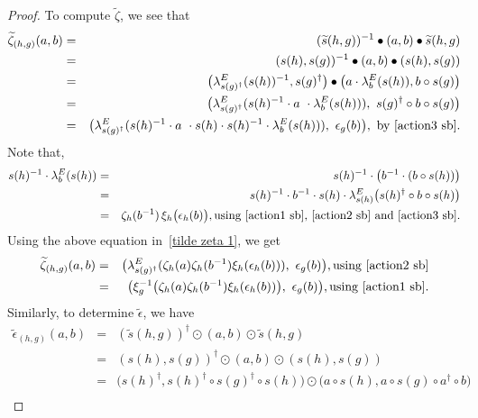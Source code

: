 \documentclass{jonasart}
\theoremstyle{plain}
\begin{document}
\begin{proof}
		To compute $\widetilde{\zeta}$, we see that
		\begin{eqnarray}
			\widetilde{\zeta}_{(h,g)}(a,b)&=& (\widetilde{s}(h,g))^{-1} \bullet (a,b) \bullet \widetilde{s}(h,g )\nonumber\\
			&=& (s(h),s(g))^{-1} \bullet (a,b) \bullet (s(h),s(g) )\nonumber\\
			&=& \big(\lambda^E_{s(g)^\dagger}(s(h))^{-1},s(g)^\dagger \big) \bullet \big(a \cdot \lambda^E_b (s(h)),b\circ s(g) \big)\nonumber\\
			&=& \big(\lambda^E_{s(g)^\dagger}(s(h)^{-1} \cdot a~\cdot \lambda^E_b (s(h)) ),~s(g)^\dagger \circ b\circ s(g)\big)\nonumber\\
			&=& \big(\lambda^E_{s(g)^\dagger}(s(h)^{-1} \cdot a~\cdot s(h)\cdot s(h)^{-1}\cdot\lambda^E_b (s(h))),~\epsilon_g (b)\big),~\textrm{by}~\eqref{action3 sb}.\label{tilde zeta 1}
		\end{eqnarray}
		Note that,
		\begin{eqnarray*}
			s(h)^{-1} \cdot \lambda^E_b (s(h))&=& s(h)^{-1}\cdot \big(b^{-1}\cdot(b\circ s(h))\big)\\
			&=&s(h)^{-1}\cdot b^{-1}\cdot s(h)\cdot \lambda^E_{s(h)} \big(s(h)^\dagger\circ b\circ s(h)\big)\\
			&=&\zeta_h (b^{-1})\, \xi_h \big(\epsilon_h (b)\big), \text{using~\eqref{action1 sb},~\eqref{action2 sb} and~\eqref{action3 sb}}.
		\end{eqnarray*}
		Using the above equation in~\eqref{tilde zeta 1}, we get
		\begin{eqnarray}
			\widetilde{\zeta}_{(h,g)}(a,b) &=& \big(\lambda^E_{s(g)^\dagger}(\zeta_h (a)\zeta_h (b^{-1})\xi_h (\epsilon_h (b))),~\epsilon_g (b)\big), \text{using~\eqref{action2 sb}}\nonumber\\
			&=& \big(\xi^{-1}_g \big(\zeta_h (a)\zeta_h (b^{-1})\xi_h (\epsilon_h (b)) \big),~\epsilon_g (b)\big), \text{using~\eqref{action1 sb}.}\label{tilde zeta}
		\end{eqnarray}
		Similarly, to determine $\widetilde{\epsilon}$, we have
		\begin{eqnarray}
			\widetilde{\epsilon}_{(h,g)}(a,b)&=&(\widetilde{s}(h,g))^\dagger\odot (a,b)\odot \widetilde{s}(h,g)\nonumber\\
			&=&(s(h),s(g))^\dagger\odot(a,b)\odot(s(h),s(g))\nonumber\\
			&=&\big(s(h)^\dagger,s(h)^\dagger\circ s(g)^\dagger\circ s(h)\big)\odot \big(a\circ s(h),a\circ s(g)\circ a^\dagger \circ b\big)\nonumber\\

\end{eqnarray}
\end{proof}
\end{document}
